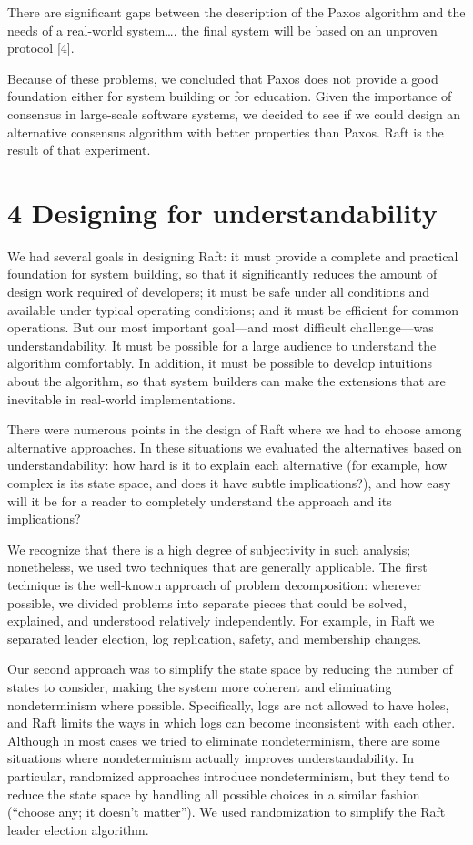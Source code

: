 \documentclass[
]{article}
\newcounter{none} %
\begin{document}
There are significant gaps between the description of the Paxos
algorithm and the needs of a real-world system\ldots. the final system
will be based on an unproven protocol {[}4{]}.

Because of these problems, we concluded that Paxos does not provide a
good foundation either for system building or for education. Given the
importance of consensus in large-scale software systems, we decided to
see if we could design an alternative consensus algorithm with better
properties than Paxos. Raft is the result of that experiment.

\section{4 Designing for
understandability}\label{designing-for-understandability}

We had several goals in designing Raft: it must provide a complete and
practical foundation for system building, so that it significantly
reduces the amount of design work required of developers; it must be
safe under all conditions and available under typical operating
conditions; and it must be efficient for common operations. But our most
important goal---and most difficult challenge---was understandability.
It must be possible for a large audience to understand the algorithm
comfortably. In addition, it must be possible to develop intuitions
about the algorithm, so that system builders can make the extensions
that are inevitable in real-world implementations.

There were numerous points in the design of Raft where we had to choose
among alternative approaches. In these situations we evaluated the
alternatives based on understandability: how hard is it to explain each
alternative (for example, how complex is its state space, and does it
have subtle implications?), and how easy will it be for a reader to
completely understand the approach and its implications?

We recognize that there is a high degree of subjectivity in such
analysis; nonetheless, we used two techniques that are generally
applicable. The first technique is the well-known approach of problem
decomposition: wherever possible, we divided problems into separate
pieces that could be solved, explained, and understood relatively
independently. For example, in Raft we separated leader election, log
replication, safety, and membership changes.

Our second approach was to simplify the state space by reducing the
number of states to consider, making the system more coherent and
eliminating nondeterminism where possible. Specifically, logs are not
allowed to have holes, and Raft limits the ways in which logs can become
inconsistent with each other. Although in most cases we tried to
eliminate nondeterminism, there are some situations where nondeterminism
actually improves understandability. In particular, randomized
approaches introduce nondeterminism, but they tend to reduce the state
space by handling all possible choices in a similar fashion (``choose
any; it doesn't matter''). We used randomization to simplify the Raft
leader election algorithm.
\end{document}
